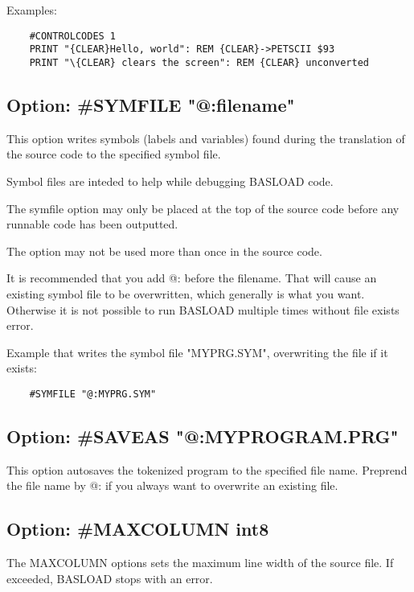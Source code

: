 \documentclass{article}
\begin{document}
        Examples:

    \begin{verbatim}
    #CONTROLCODES 1
    PRINT "{CLEAR}Hello, world": REM {CLEAR}->PETSCII $93
    PRINT "\{CLEAR} clears the screen": REM {CLEAR} unconverted
    \end{verbatim}

    \subsection{Option: \#SYMFILE "@:filename"}

        This option writes symbols (labels and variables) found during the
        translation of the source code to the specified
        symbol file.

        Symbol files are inteded to help while debugging BASLOAD code.
    
        The symfile option may only be placed at the top of
        the source code before any runnable code has
        been outputted.

        The option may not be used more than once in the source code.

        It is recommended that you add @: before the filename. That will cause
        an existing symbol file to be overwritten, which generally is what you
        want. Otherwise it is not possible to run BASLOAD multiple times
        without file exists error.

        Example that writes the symbol file "MYPRG.SYM", overwriting the
        file if it exists:
        \begin{verbatim}
    #SYMFILE "@:MYPRG.SYM"
        \end{verbatim}

    \subsection{Option: \#SAVEAS "@:MYPROGRAM.PRG"}
        
        This option autosaves the tokenized program to the
        specified file name. Preprend the file name by
        @: if you always want to overwrite an existing file.

    \subsection{Option: \#MAXCOLUMN int8}
    
        The MAXCOLUMN options sets the maximum line width
        of the source file. If exceeded, BASLOAD stops with an
        error.
\end{document}
